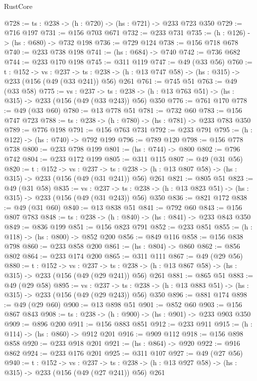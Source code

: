 \begin{lexlean}{RustCore}
\begin{coremodule}
@728 := {ts : @238} -> (h : @720) -> (hs : @721) -> @233 @723 @350
@729 := @716 @197
@731 := @156 @703 @671
@732 := @233 @731
@735 := (h : @126) -> (hs : @680) -> @732 @198
@736 := @729 @124
@738 := @156 @718 @678
@740 := @233 @738 @198
@741 := (hs : @684) -> @740
@742 := @736 @682
@744 := @233 @170 @198
@745 := @311 @119
@747 := @49 (@33 @56)
@760 := {t : @152} ->
  {vs : @237} ->
  {ts : @238} -> (h : @13 @747 @58) -> (hs : @315) -> @233 (@156 (@49 (@33 @241)) @56) @261
@761 := @745 @51
@763 := @49 (@33 @58)
@775 := {vs : @237} ->
  {ts : @238} -> (h : @13 @763 @51) -> (hs : @315) -> @233 (@156 (@49 (@33 @243)) @56) @350
@776 := @761 @170
@778 := @49 (@33 @60)
@780 := @13 @778 @51
@781 := @732 @60
@783 := @156 @747 @723
@788 := {ts : @238} -> (h : @780) -> (hs : @781) -> @233 @783 @350
@789 := @776 @198
@791 := @156 @763 @731
@792 := @233 @791
@795 := (h : @122) -> (hs : @740) -> @792 @199
@796 := @789 @120
@798 := @156 @778 @738
@800 := @233 @798 @199
@801 := (hs : @744) -> @800
@802 := @796 @742
@804 := @233 @172 @199
@805 := @311 @115
@807 := @49 (@31 @56)
@820 := {t : @152} ->
  {vs : @237} ->
  {ts : @238} -> (h : @13 @807 @58) -> (hs : @315) -> @233 (@156 (@49 (@31 @241)) @56) @261
@821 := @805 @51
@823 := @49 (@31 @58)
@835 := {vs : @237} ->
  {ts : @238} -> (h : @13 @823 @51) -> (hs : @315) -> @233 (@156 (@49 (@31 @243)) @56) @350
@836 := @821 @172
@838 := @49 (@31 @60)
@840 := @13 @838 @51
@841 := @792 @60
@843 := @156 @807 @783
@848 := {ts : @238} -> (h : @840) -> (hs : @841) -> @233 @843 @350
@849 := @836 @199
@851 := @156 @823 @791
@852 := @233 @851
@855 := (h : @118) -> (hs : @800) -> @852 @200
@856 := @849 @116
@858 := @156 @838 @798
@860 := @233 @858 @200
@861 := (hs : @804) -> @860
@862 := @856 @802
@864 := @233 @174 @200
@865 := @311 @111
@867 := @49 (@29 @56)
@880 := {t : @152} ->
  {vs : @237} ->
  {ts : @238} -> (h : @13 @867 @58) -> (hs : @315) -> @233 (@156 (@49 (@29 @241)) @56) @261
@881 := @865 @51
@883 := @49 (@29 @58)
@895 := {vs : @237} ->
  {ts : @238} -> (h : @13 @883 @51) -> (hs : @315) -> @233 (@156 (@49 (@29 @243)) @56) @350
@896 := @881 @174
@898 := @49 (@29 @60)
@900 := @13 @898 @51
@901 := @852 @60
@903 := @156 @867 @843
@908 := {ts : @238} -> (h : @900) -> (hs : @901) -> @233 @903 @350
@909 := @896 @200
@911 := @156 @883 @851
@912 := @233 @911
@915 := (h : @114) -> (hs : @860) -> @912 @201
@916 := @909 @112
@918 := @156 @898 @858
@920 := @233 @918 @201
@921 := (hs : @864) -> @920
@922 := @916 @862
@924 := @233 @176 @201
@925 := @311 @107
@927 := @49 (@27 @56)
@940 := {t : @152} ->
  {vs : @237} ->
  {ts : @238} -> (h : @13 @927 @58) -> (hs : @315) -> @233 (@156 (@49 (@27 @241)) @56) @261

\end{coremodule}
\end{lexlean}
